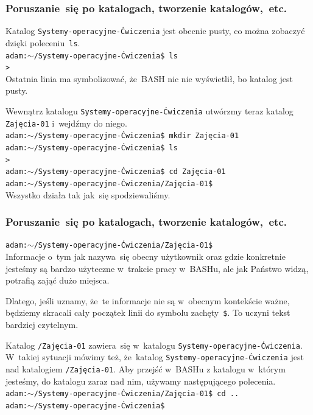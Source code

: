 \documentclass[10pt,t]{beamer}
\begin{document}
\begin{frame}
  \frametitle{Poruszanie~się po katalogach, tworzenie
    katalogów,~etc.}


  Katalog \texttt{Systemy-operacyjne-Ćwiczenia} jest obecnie pusty, co
  można zobaczyć dzięki poleceniu~\texttt{ls}. \\
  \texttt{adam:$\sim$/Systemy-operacyjne-Ćwiczenia\$ ls} \\
  \texttt{>} \\
  Ostatnia linia ma symbolizować, że~BASH nic nie wyświetlił, bo katalog
  jest pusty.

  Wewnątrz katalogu \texttt{Systemy-operacyjne-Ćwiczenia} utwórzmy teraz
  katalog \texttt{Zajęcia-01} i~wejdźmy do niego. \\
  \texttt{adam:$\sim$/Systemy-operacyjne-Ćwiczenia\$ mkdir Zajęcia-01} \\
  \texttt{adam:$\sim$/Systemy-operacyjne-Ćwiczenia\$ ls} \\
  \texttt{> } \\
  \texttt{adam:$\sim$/Systemy-operacyjne-Ćwiczenia\$ cd Zajęcia-01} \\
  \texttt{adam:$\sim$/Systemy-operacyjne-Ćwiczenia/Zajęcia-01\$} \\
  Wszystko działa tak jak~się spodziewaliśmy.

\end{frame}





\begin{frame}
  \frametitle{Poruszanie~się po katalogach, tworzenie
    katalogów,~etc.}


  \texttt{adam:$\sim$/Systemy-operacyjne-Ćwiczenia/Zajęcia-01\$} \\
  Informacje o~tym jak nazywa~się obecny użytkownik oraz gdzie konkretnie
  jesteśmy są bardzo użyteczne w~trakcie pracy w~BASHu, ale jak Państwo
  widzą, potrafią zająć dużo miejsca.

  Dlatego, jeśli uznamy, że~te informacje nie są w~obecnym kontekście
  ważne, będziemy skracali cały początek linii do symbolu
  zachęty~\texttt{\$}. To uczyni tekst bardziej czytelnym.

  Katalog \texttt{/Zajęcia-01} zawiera~się w~katalogu
  \texttt{Systemy-operacyjne-Ćwiczenia}. W~takiej sytuacji mówimy też,
  że~katalog \texttt{Systemy-operacyjne-Ćwiczenia} jest nad katalogiem
  \texttt{/Zajęcia-01}. Aby przejść w~BASHu z katalogu w~którym jesteśmy,
  do katalogu zaraz nad nim, używamy następującego polecenia. \\
  \texttt{adam:$\sim$/Systemy-operacyjne-Ćwiczenia/Zajęcia-01\$ cd ..} \\
  \texttt{adam:$\sim$/Systemy-operacyjne-Ćwiczenia\$}

\end{frame}
\end{document}
